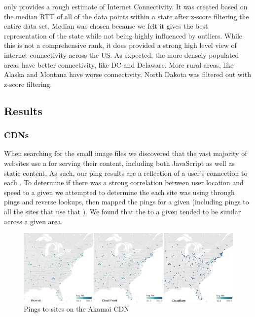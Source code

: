  

 only provides a rough estimate of Internet Connectivity. It was created based on the median RTT of all of the data points within a state after z-score filtering the entire data set. Median was chosen because we felt it gives the best representation of the state while not being highly influenced by outliers. While this is not a comprehensive rank, it does provided a strong high level view of internet connectivity across the US. As expected, the more densely populated areas have better connectivity, like DC and Delaware. More rural areas, like Alaska and Montana have worse connectivity. North Dakota was filtered out with z-score filtering.

\subsection{Results}

\subsubsection{CDNs}
When searching for the small image files we discovered that the vast majority of websites use a \cdn for serving their content, including both JavaScript as well as static content. As such, our ping results are a reflection of a user's connection to each \cdn. To determine if there was a strong correlation between user location and speed to a given \cdn we attempted to determine the \cdn each site was using through \icmp pings and reverse \dns lookups, then mapped the pings for a given \cdn (including pings to all the sites that use that \cdn). We found that the \rtt to a given \cdn tended to be similar across a given area.

\begin{figure}[htb]
    \centering
    \includegraphics[width=1\textwidth]{images/siteping/cdn_combined.png}
    \caption{Pings to sites on the Akamai CDN} %
    \label{fig:akamai_cdn}
\end{figure}

